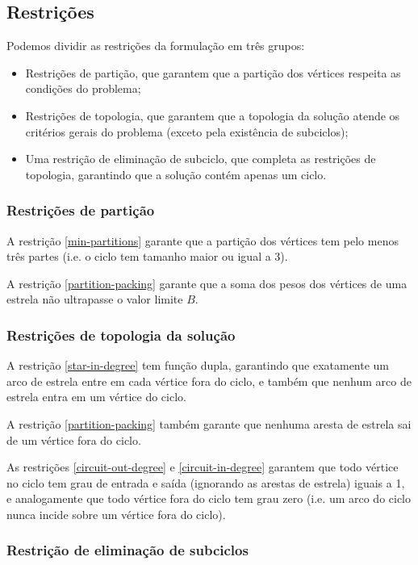 \documentclass{article}
\begin{document}
\subsection{Restrições}

Podemos dividir as restrições da formulação em três grupos: 
\begin{itemize}
    \item Restrições de partição, que garantem que a partição dos vértices respeita as condições do problema;
    \item Restrições de topologia, que garantem que a topologia da solução atende os critérios gerais do problema (exceto pela existência de subciclos);
    \item Uma restrição de eliminação de subciclo, que completa as restrições de topologia, garantindo que a solução contém apenas um ciclo. 
\end{itemize}

\subsubsection{Restrições de partição}

A restrição \ref{min-partitions} garante que a partição dos vértices tem pelo menos três partes (i.e. o ciclo tem tamanho maior ou igual a 3).

A restrição \ref{partition-packing} garante que a soma dos pesos dos vértices de uma estrela não ultrapasse o valor limite $B$.

\subsubsection{Restrições de topologia da solução}

A restrição \ref{star-in-degree} tem função dupla, garantindo que exatamente um arco de estrela entre em cada vértice fora do ciclo, e também que nenhum arco de estrela entra em um vértice do ciclo.

A restrição \ref{partition-packing} também garante que nenhuma aresta de estrela sai de um vértice fora do ciclo.

As restrições \ref{circuit-out-degree}  e \ref{circuit-in-degree} garantem que todo vértice no ciclo tem grau de entrada e saída (ignorando as arestas de estrela) iguais a 1, e analogamente que todo vértice fora do ciclo tem grau zero (i.e. um arco do ciclo nunca incide sobre um vértice fora do ciclo).

\subsubsection{Restrição de eliminação de subciclos}
\end{document}
